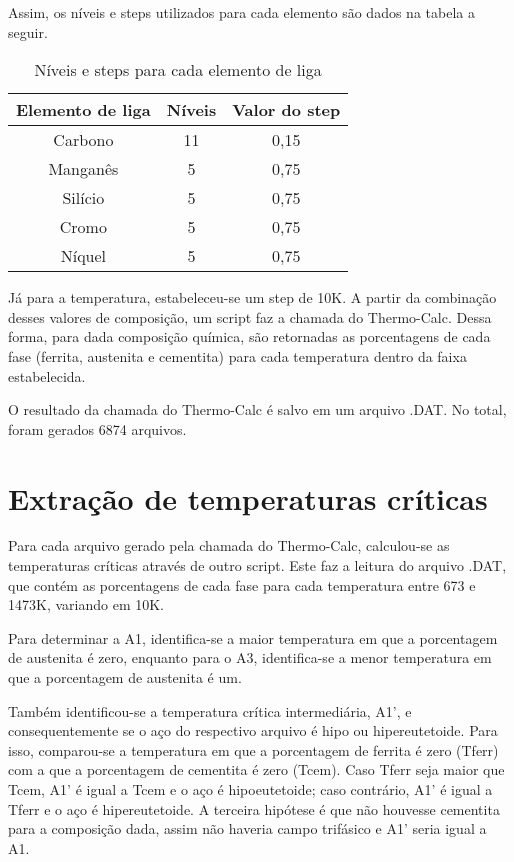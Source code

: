 \documentclass[hidelinks,brazil,dissertacao,epusp]{usp}
\begin{document}
Assim, os níveis e steps utilizados para cada elemento são dados na tabela a seguir.

\begin{table}
  \caption{Níveis e steps para cada elemento de liga}
  
  \begin{tabular}{c c c}
  \hline
  \textbf{Elemento de liga} & \textbf{Níveis} & \textbf{Valor do step} \\
  \hline
  Carbono & 11 & 0,15 \\
  Manganês & 5 & 0,75 \\
  Silício & 5 & 0,75 \\
  Cromo & 5 & 0,75 \\
  Níquel & 5 & 0,75 \\
  \hline
  \end{tabular}
  
  \label{tab:faixas_composicao}
\end{table}


Já para a temperatura, estabeleceu-se um step de 10K. A partir da combinação desses valores de composição, um script faz a chamada do Thermo-Calc\textregistered{}. Dessa forma, para dada composição química, são retornadas as porcentagens de cada fase (ferrita, austenita e cementita) para cada temperatura dentro da faixa estabelecida.

O resultado da chamada do Thermo-Calc\textregistered{} é salvo em um arquivo .DAT. No total, foram gerados 6874 arquivos.

\section{Extração de temperaturas críticas}

Para cada arquivo gerado pela chamada do Thermo-Calc\textregistered{}, calculou-se as temperaturas críticas através de outro script. Este faz a leitura do arquivo .DAT, que contém as porcentagens de cada fase para cada temperatura entre 673 e 1473K, variando em 10K.

Para determinar a A1, identifica-se a maior temperatura em que a porcentagem de austenita é zero, enquanto para o A3, identifica-se a menor temperatura em que a porcentagem de austenita é um.

Também identificou-se a temperatura crítica intermediária, A1', e consequentemente se o aço do respectivo arquivo é hipo ou hipereutetoide. Para isso, comparou-se a temperatura em que a porcentagem de ferrita é zero (Tferr) com a que a porcentagem de cementita é zero (Tcem). Caso Tferr seja maior que Tcem, A1' é igual a Tcem e o aço é hipoeutetoide; caso contrário, A1' é igual a Tferr e o aço é hipereutetoide. A terceira hipótese é que não houvesse cementita para a composição dada, assim não haveria campo trifásico e A1' seria igual a A1.
\end{document}
